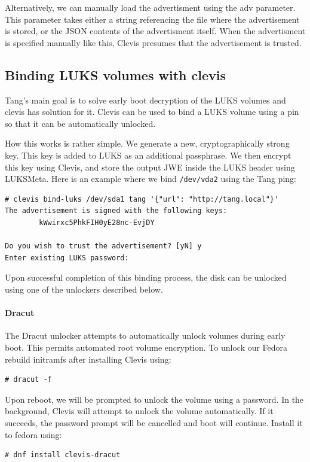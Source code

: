 Alternatively, we can manually load the advertisment using the adv parameter.
This parameter takes either a string referencing the file where the advertisement is stored, or the JSON contents of the advertisment itself.
When the advertisment is specified manually like this, Clevis presumes that the advertisement is trusted.



\subsection{Binding LUKS volumes with clevis}\label{dracut}
Tang's main goal is to solve early boot decryption of the LUKS volumes and clevis has solution for it.
Clevis can be used to bind a LUKS volume using a pin so that it can be automatically unlocked.

How this works is rather simple. We generate a new, cryptographically strong key.
This key is added to LUKS as an additional passphrase.
We then encrypt this key using Clevis, and store the output JWE inside the LUKS header using LUKSMeta.
Here is an example where we bind {\tt /dev/vda2} using the Tang ping:
\begin{lstlisting}[columns=fixed,basicstyle=\ttfamily\footnotesize,tabsize=4,backgroundcolor=\color{yellow!10}]
# clevis bind-luks /dev/sda1 tang '{"url": "http://tang.local"}'
The advertisement is signed with the following keys:
        kWwirxc5PhkFIH0yE28nc-EvjDY

Do you wish to trust the advertisement? [yN] y
Enter existing LUKS password:
\end{lstlisting}

Upon successful completion of this binding process, the disk can be unlocked using one of the unlockers described below\cite{clevis}.


\paragraph{Dracut}\label{dracut}
The Dracut unlocker attempts to automatically unlock volumes during early boot.
This permits automated root volume encryption.
To unlock our Fedora rebuild initramfs after installing Clevis using:

\begin{lstlisting}[columns=fixed,basicstyle=\ttfamily\footnotesize,tabsize=4,backgroundcolor=\color{yellow!10}]
# dracut -f
\end{lstlisting}
Upon reboot, we will be prompted to unlock the volume using a password.
In the background, Clevis will attempt to unlock the volume automatically.
If it succeeds, the password prompt will be cancelled and boot will continue.
Install it to fedora using:
\begin{lstlisting}[columns=fixed,basicstyle=\ttfamily\footnotesize,tabsize=4,backgroundcolor=\color{yellow!10}]
# dnf install clevis-dracut
\end{lstlisting}
